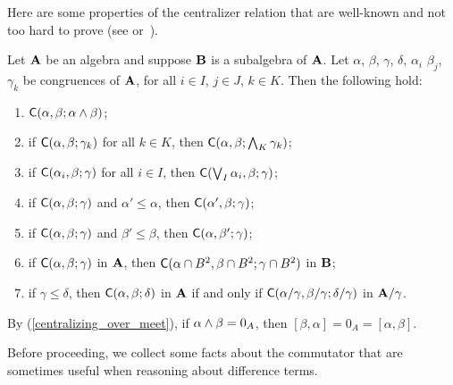 Here are some properties of the centralizer relation
that are well-known and not too hard to prove
(see \cite[Prop~3.4]{HM:1988} or~\cite[Thm~2.19]{MR3076179}).
\begin{lem}
\label{lem:centralizers}
Let $\mathbf{A}$ be an algebra and suppose
$\mathbf{B}$ is a subalgebra of $\mathbf{A}$. 
Let $\alpha$, $\beta$, $\gamma$, $\delta$, $\alpha_i$
$\beta_j$, $\gamma_k$
be congruences of $\mathbf{A}$, for all 
$i \in I$, $j\in J$, $k \in K$. Then the following hold:
\begin{enumerate}
\item \label{centralizing_over_meet}
  $\mathsf{C}(\alpha, \beta; \alpha \wedge \beta)$;
\item \label{centralizing_over_meet2}
  if $\mathsf{C}(\alpha,  \beta;  \gamma_k)$ for all $k \in K$, then
  $\mathsf{C}(\alpha,  \beta;  \bigwedge_{K}\gamma_k)$;
\item \label{centralizing_over_join1}
  if $\mathsf{C}(\alpha_i,  \beta;  \gamma)$ for all $i\in I$, then
  $\mathsf{C}(\bigvee_{I}\alpha_i,  \beta; \gamma)$;
\item \label{monotone_centralizers1}
  if $\mathsf{C}(\alpha,  \beta;  \gamma)$ and $\alpha' \leq \alpha$, then 
  $\mathsf{C}(\alpha',  \beta;  \gamma)$;
\item \label{monotone_centralizers2}
  if $\mathsf{C}(\alpha,  \beta;  \gamma)$ and $\beta' \leq \beta$, then
  $\mathsf{C}(\alpha,  \beta';  \gamma)$;
\item \label{centralizing_over_subalg}
  if $\mathsf{C}(\alpha,  \beta;  \gamma)$ in $\mathbf{A}$, 
  then $\mathsf{C}(\alpha\cap B^2,  \beta\cap B^2; \gamma\cap B^2)$ in $\mathbf{B}$;
\item \label{centralizing_factors}
  if $\gamma \leq \delta$, then $\mathsf{C}(\alpha,  \beta;  \delta)$
  in $\mathbf{A}$ if and only if $\mathsf{C}(\alpha/\gamma,  \beta/\gamma;  \delta/\gamma)$
  in $\mathbf{A}/\gamma$.
\end{enumerate}
\end{lem}


\begin{rem}
By (\ref{centralizing_over_meet}), 
if $\alpha \wedge \beta = 0_{A}$,  
then %
$[\beta, \alpha] = 0_A = [\alpha, \beta]$.
\end{rem}

\draftsecskip

Before proceeding, we collect some facts about the commutator that are
sometimes useful when reasoning about difference terms.


